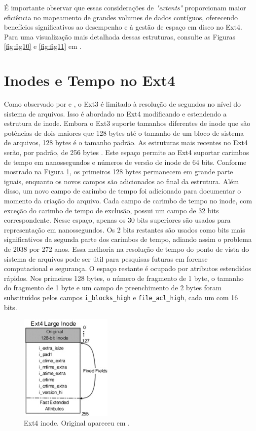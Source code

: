 \documentclass[
	12pt,				%
	openright,			%
	oneside,			%
	a4paper,			%
	chapter=TITLE,		%
	english,			%
	french,				%
	spanish,			%
	brazil				%
	]{abntex2}
\theoremstyle{definition}
\begin{document}
É importante observar que essas considerações de \textit{"extents"} proporcionam maior eficiência 
no mapeamento de grandes volumes de dados contíguos, oferecendo benefícios significativos ao 
desempenho e à gestão de espaço em disco no Ext4. Para uma visualização mais detalhada dessas 
estruturas, consulte as Figuras \ref{fig:fig10} e \ref{fig:fig11} em \cite{matur}.

\section{Inodes e Tempo no Ext4}

Como observado por \cite{matur} e \cite{xia}, o Ext3 é limitado à resolução de segundos 
no nível do sistema de arquivos. Isso é abordado no Ext4 modificando e estendendo a estrutura de 
inode. Embora o Ext3 suporte tamanhos diferentes de inode que são potências de dois maiores que 128 
bytes até o tamanho de um bloco de sistema de arquivos, 128 bytes é o tamanho padrão. As estruturas 
mais recentes no Ext4 serão, por padrão, de 256 bytes \cite{matur}. Este espaço permite ao 
Ext4 suportar carimbos de tempo em nanossegundos e números de versão de inode de 64 bits. 
Conforme mostrado na Figura \ref{fig:ext4-inode}, os primeiros 128 bytes permanecem em 
grande parte iguais, enquanto os novos campos são adicionados ao final da estrutura. 
Além disso, um novo campo de carimbo de tempo foi adicionado para documentar o momento 
da criação do arquivo. Cada campo de carimbo de tempo no inode, com exceção do carimbo de tempo de 
exclusão, possui um campo de 32 bits correspondente. Nesse espaço, apenas os 30 bits superiores são 
usados para representação em nanossegundos. Os 2 bits restantes são usados como bits mais significativos 
da segunda parte dos carimbos de tempo, adiando assim o problema de 2038 por 272 anos. 
Essa melhoria na resolução de tempo do ponto de vista do sistema de arquivos pode ser 
útil para pesquisas futuras em forense computacional e segurança. O espaço restante é 
ocupado por atributos estendidos rápidos. Nos primeiros 128 bytes, o número de fragmento 
de 1 byte, o tamanho do fragmento de 1 byte e um campo de preenchimento de 2 bytes foram 
substituídos pelos campos \texttt{i\_blocks\_high} e \texttt{file\_acl\_high}, cada um com 16 bits.

\begin{figure}[H]
  \centering
  \includegraphics[width=0.4\textwidth]{fig12.jpg}
  \caption{Ext4 inode. Original apareceu em \cite{matur}.}
  \label{fig:ext4-inode}
\end{figure}
\end{document}
